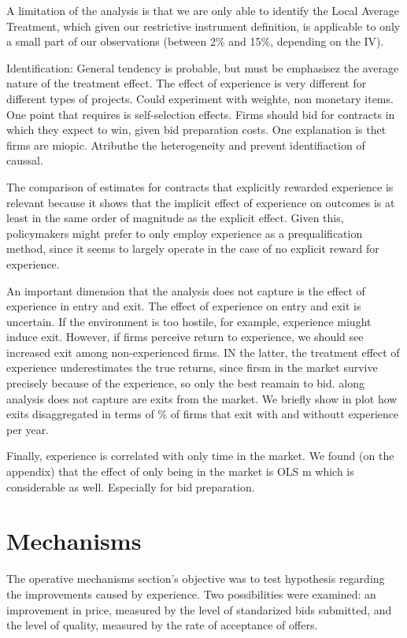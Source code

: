 A limitation of the analysis is that we are only able to identify the Local Average Treatment, which given our restrictive instrument definition, is applicable to only a small part of our observations (between 2\% and 15\%, depending on the IV).

Identification: General tendency is probable, but must be emphasisez the average nature of the treatment effect. The effect of experience is very different for different types of projects. Could experiment with weighte, non monetary items. One point that requires is self-selection effects. Firms should bid for contracts in which they expect to win, given bid preparation costs. One explanation is thet firms are miopic. Atributhe the heterogeneity and prevent identifiaction of caussal.

The comparison of estimates for contracts that explicitly rewarded experience is relevant because it shows that the implicit effect of experience on outcomes is at least in the same order of magnitude as the explicit effect. Given this, policymakers might prefer to only employ experience as a prequalification method, since it seems to largely operate in the case of no explicit reward for experience.

An important dimension that the analysis does not capture is the effect of experience in entry and exit. The effect of experience on entry and exit is uncertain. If the environment is too hostile, for example, experience miught induce exit. However, if firms perceive return to experience, we should see increased exit among non-experienced firms. IN the latter, the treatment effect of experience underestimates the true returns, since firsm in the market survive precisely because of the experience, so only the best reamain to bid.
along analysis does not capture are exits from the market. We briefly show in plot how exits disaggregated in terms of \% of firms that exit with and withoutt experience per year.

Finally, experience is correlated with only time in the market. We found (on the appendix) that the effect of only being in the market is OLS m which is considerable as well. Especially for bid preparation.


\section{Mechanisms}

The operative mechanisms section's objective was to test hypothesis regarding the improvements caused by experience. Two possibilities were examined: an improvement in price, measured by the level of standarized bids submitted, and the level of quality, measured by the rate of acceptance of offers.

